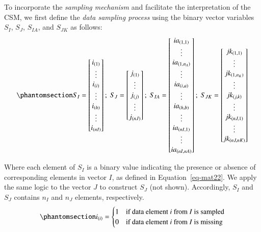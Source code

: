 \documentclass[
  authoryear,
  review,
  1p]{elsarticle}
\begin{document}
To incorporate the \emph{sampling mechanism} and facilitate the
interpretation of the CSM, we first define the \emph{data sampling
process} using the binary vector variables \(S_{I}\), \(S_{J}\),
\(S_{IA}\), and \(S_{JK}\) as follows:
\begin{equation}\protect\phantomsection\label{eq-mat21}{
S_{I} = \begin{bmatrix}
i_{(1)} \\
\vdots \\
i_{(i)} \\
\vdots \\
i_{(h)} \\
\vdots \\
i_{(nI)}
\end{bmatrix} ; \;
S_{J} = \begin{bmatrix}
j_{(1)} \\
\vdots \\
j_{(j)} \\
\vdots \\
j_{(nJ)}
\end{bmatrix} ; \;
S_{IA} = \begin{bmatrix}
ia_{(1,1)} \\
\vdots \\
ia_{(1,n_{A})} \\
\vdots \\
ia_{(i,a)} \\
\vdots \\
ia_{(h,b)} \\
\vdots \\
ia_{(nI,1)} \\
\vdots \\
ia_{(nI,nA)}
\end{bmatrix} ; \;
S_{JK} = \begin{bmatrix}
jk_{(1,1)} \\
\vdots \\
jk_{(1,n_{K})} \\
\vdots \\
jk_{(j,k)} \\
\vdots \\
jk_{(nJ,1)} \\
\vdots \\
jk_{(nJ,nK)}
\end{bmatrix}
}\end{equation}

Where each element of \(S_{I}\) is a binary value indicating the
presence or absence of corresponding elements in vector \(I\), as
defined in Equation~\ref{eq-mat22}. We apply the same logic to the
vector \(J\) to construct \(S_{J}\) (not shown). Accordingly, \(S_{I}\)
and \(S_{J}\) contains \(n_{I}\) and \(n_{J}\) elements, respectively.
\begin{equation}\protect\phantomsection\label{eq-mat22}{
i_{(i)} = \begin{cases} 
1 & \text{if data element } i \text{ from } I \text{ is sampled} \\
0 & \text{if data element } i \text{ from } I \text{ is missing}
\end{cases}
}\end{equation}
\end{document}
